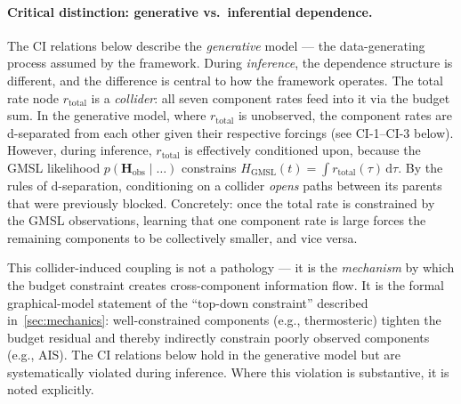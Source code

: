 \documentclass[11pt]{article}
\newcommand{\GMSL}{\text{GMSL}}
\begin{document}
\paragraph{Critical distinction: generative vs.\ inferential dependence.}
The CI relations below describe the \emph{generative} model --- the data-generating process assumed by the framework.  During \emph{inference}, the dependence structure is different, and the difference is central to how the framework operates.  The total rate node $r_{\text{total}}$ is a \emph{collider}: all seven component rates feed into it via the budget sum.  In the generative model, where $r_{\text{total}}$ is unobserved, the component rates are d-separated from each other given their respective forcings (see CI-1--CI-3 below).  However, during inference, $r_{\text{total}}$ is effectively conditioned upon, because the GMSL likelihood $p(\mathbf{H}_{\text{obs}} \mid \ldots)$ constrains $H_{\GMSL}(t) = \int r_{\text{total}}(\tau)\,\mathrm{d}\tau$.  By the rules of d-separation, conditioning on a collider \emph{opens} paths between its parents that were previously blocked.  Concretely: once the total rate is constrained by the GMSL observations, learning that one component rate is large forces the remaining components to be collectively smaller, and vice versa.

This collider-induced coupling is not a pathology --- it is the \emph{mechanism} by which the budget constraint creates cross-component information flow.  It is the formal graphical-model statement of the ``top-down constraint'' described in~\cref{sec:mechanics}: well-constrained components (e.g., thermosteric) tighten the budget residual and thereby indirectly constrain poorly observed components (e.g., AIS).  The CI relations below hold in the generative model but are systematically violated during inference.  Where this violation is substantive, it is noted explicitly.
\end{document}
